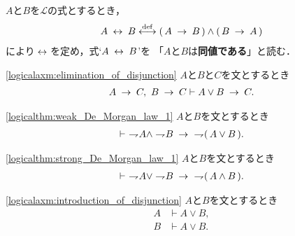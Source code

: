 	\begin{screen}
		\begin{dfn}[同値記号]
			$A$と$B$を$\mathcal{L}$の式とするとき，
			\begin{align}
				A \hspace{0.25em}\leftrightarrow\hspace{0.25em} B  \overset{\mathrm{def}}{\longleftrightarrow}
				(\, A \hspace{0.25em}\rightarrow\hspace{0.25em} B\, ) \wedge (\, B \hspace{0.25em}\rightarrow\hspace{0.25em} A\, )
			\end{align}
			により$\hspace{0.25em}\leftrightarrow\hspace{0.25em}$を定め，式`$A \hspace{0.25em}\leftrightarrow\hspace{0.25em} B$'を
			「$A$と$B$は{\bf 同値である}」と読む．
		\end{dfn}
	\end{screen}
	
	\begin{screen}
		\begin{logicalaxm}[場合分け規則]
		\ref{logicalaxm:elimination_of_disjunction}
			$A$と$B$と$C$を文とするとき
			\begin{align}
				A \hspace{0.25em}\rightarrow\hspace{0.25em} C,\ B \hspace{0.25em}\rightarrow\hspace{0.25em} C \vdash A \vee B \hspace{0.25em}\rightarrow\hspace{0.25em} C.
			\end{align}
		\end{logicalaxm}
	\end{screen}
	
	\begin{screen}
		\begin{logicalthm}
		\ref{logicalthm:weak_De_Morgan_law_1}
			$A$と$B$を文とするとき
			\begin{align}
				\vdash\ \rightharpoondown\hspace{-0.25em} A \wedge \rightharpoondown\hspace{-0.25em} B
				\hspace{0.25em}\rightarrow\hspace{0.25em}\ \rightharpoondown\hspace{-0.25em} (\, A \vee B\, ).
			\end{align}
		\end{logicalthm}
	\end{screen}
	
	\begin{screen}
		\begin{logicalthm}
		\ref{logicalthm:strong_De_Morgan_law_1}
			$A$と$B$を文とするとき
			\begin{align}
				\vdash\ \rightharpoondown\hspace{-0.25em} A \vee \rightharpoondown\hspace{-0.25em} B
				\hspace{0.25em}\rightarrow\hspace{0.25em}\ \rightharpoondown\hspace{-0.25em} (\, A \wedge B\, ).
			\end{align}
		\end{logicalthm}
	\end{screen}
	
	\begin{screen}
		\begin{logicalaxm}[論理和の導入]
		\ref{logicalaxm:introduction_of_disjunction}
			$A$と$B$を文とするとき
			\begin{align}
				A &\vdash A \vee B, \\
				B &\vdash A \vee B.
			\end{align}
		\end{logicalaxm}
	\end{screen}
	
